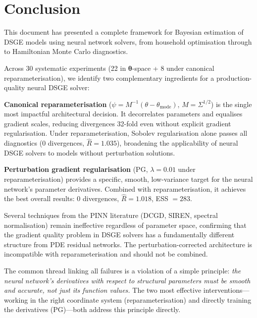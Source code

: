 \documentclass[11pt,a4paper]{article}
\theoremstyle{definition}
\newcommand{\btheta}{\boldsymbol{\theta}}
\begin{document}
	
	\section{Conclusion}
	\label{sec:conclusion}
	
	This document has presented a complete framework for Bayesian estimation of DSGE models using neural network solvers, from household optimisation through to Hamiltonian Monte Carlo diagnostics.
	
	Across 30 systematic experiments (22 in $\btheta$-space + 8 under canonical reparameterisation), we identify two complementary ingredients for a production-quality neural DSGE solver:
	
	\textbf{Canonical reparameterisation} ($\psi = M^{-1}(\theta - \theta_{\mathrm{mode}})$, $M = \Sigma^{1/2}$) is the single most impactful architectural decision.
	It decorrelates parameters and equalises gradient scales, reducing divergences 32-fold even without explicit gradient regularisation.
	Under reparameterisation, Sobolev regularisation alone passes all diagnostics (0 divergences, $\hat{R} = 1.035$), broadening the applicability of neural DSGE solvers to models without perturbation solutions.
	
	\textbf{Perturbation gradient regularisation} (PG, $\lambda = 0.01$ under reparameterisation) provides a specific, smooth, low-variance target for the neural network's parameter derivatives.
	Combined with reparameterisation, it achieves the best overall results: 0 divergences, $\hat{R} = 1.018$, ESS $= 283$.
	
	Several techniques from the PINN literature (DCGD, SIREN, spectral normalisation) remain ineffective regardless of parameter space, confirming that the gradient quality problem in DSGE solvers has a fundamentally different structure from PDE residual networks.
	The perturbation-corrected architecture is incompatible with reparameterisation and should not be combined.
	
	The common thread linking all failures is a violation of a simple principle: \emph{the neural network's derivatives with respect to structural parameters must be smooth and accurate, not just its function values.}
	The two most effective interventions---working in the right coordinate system (reparameterisation) and directly training the derivatives (PG)---both address this principle directly.
	
\end{document}
